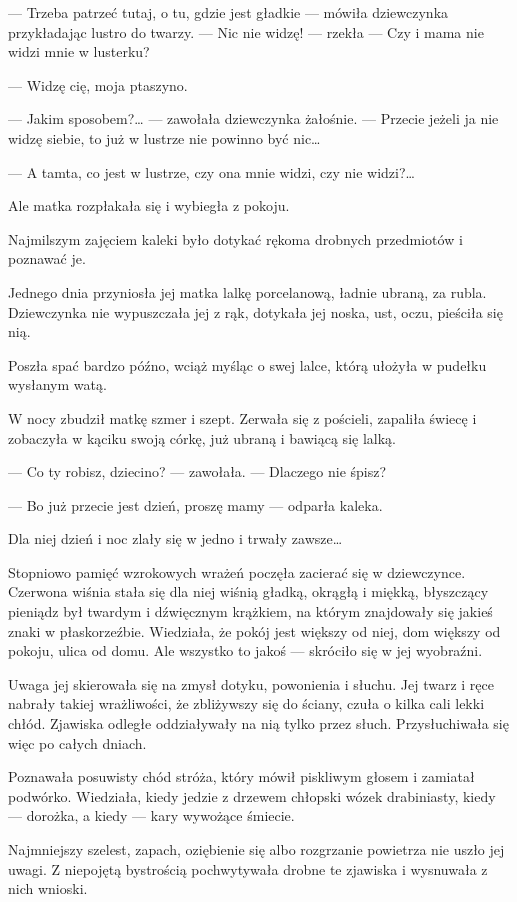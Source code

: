 — Trzeba patrzeć tutaj, o tu, gdzie jest gładkie — mówiła dziewczynka
przykładając lustro do twarzy. — Nic nie widzę! — rzekła — Czy i mama
nie widzi mnie w lusterku?

— Widzę cię, moja ptaszyno.

— Jakim sposobem?… — zawołała dziewczynka żałośnie. — Przecie jeżeli
ja nie widzę siebie, to już w lustrze nie powinno być nic…

— A tamta, co jest w lustrze, czy ona mnie widzi, czy nie widzi?…

Ale matka rozpłakała się i wybiegła z pokoju.

Najmilszym zajęciem kaleki było dotykać rękoma drobnych przedmiotów i
poznawać je.

Jednego dnia przyniosła jej matka lalkę porcelanową, ładnie ubraną, za
rubla. Dziewczynka nie wypuszczała jej z rąk, dotykała jej noska, ust,
oczu, pieściła się nią.

Poszła spać bardzo późno, wciąż myśląc o swej lalce, którą ułożyła w
pudełku wysłanym watą.

W nocy zbudził matkę szmer i szept. Zerwała się z pościeli, zapaliła
świecę i zobaczyła w kąciku swoją córkę, już ubraną i bawiącą się
lalką.

— Co ty robisz, dziecino? — zawołała. — Dlaczego nie śpisz?

— Bo już przecie jest dzień, proszę mamy — odparła kaleka.

Dla niej dzień i noc zlały się w jedno i trwały zawsze…

Stopniowo pamięć wzrokowych wrażeń poczęła zacierać się w
dziewczynce. Czerwona wiśnia stała się dla niej wiśnią gładką, okrągłą
i miękką, błyszczący pieniądz był twardym i dźwięcznym krążkiem, na
którym znajdowały się jakieś znaki w płaskorzeźbie. Wiedziała, że
pokój jest większy od niej, dom większy od pokoju, ulica od domu. Ale
wszystko to jakoś — skróciło się w jej wyobraźni.

Uwaga jej skierowała się na zmysł dotyku, powonienia i słuchu. Jej
twarz i ręce nabrały takiej wrażliwości, że zbliżywszy się do ściany,
czuła o kilka cali lekki chłód. Zjawiska odległe oddziaływały na nią
tylko przez słuch. Przysłuchiwała się więc po całych dniach.

Poznawała posuwisty chód stróża, który mówił piskliwym głosem i
zamiatał podwórko. Wiedziała, kiedy jedzie z drzewem chłopski wózek
drabiniasty, kiedy — dorożka, a kiedy — kary wywożące śmiecie.

Najmniejszy szelest, zapach, oziębienie się albo rozgrzanie powietrza
nie uszło jej uwagi. Z niepojętą bystrością pochwytywała drobne te
zjawiska i wysnuwała z nich wnioski.

